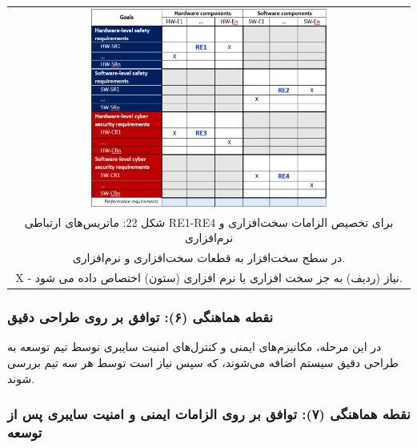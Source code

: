 \documentclass[a4paper,10pt]{article}
\begin{document}
                \begin{table}
            
                    \centering
                    \begin{tabular}{ c }
                        
                        \includegraphics[width=0.6\textwidth]{Image/fig22.jpg} \\
        
                        شکل 22: ماتریس‌های ارتباطی RE1-RE4 برای تخصیص الزامات سخت‌افزاری و نرم‌افزاری\\
                        
                        در سطح سخت‌افزار به قطعات سخت‌افزاری و نرم‌افزاری.\\

                        X - نیاز (ردیف) به جز سخت افزاری یا نرم افزاری (ستون) اختصاص داده می شود.
    
                    \end{tabular}
        
                \end{table}

            \subsubsection{نقطه هماهنگی (۶): توافق بر روی طراحی دقیق}

                در این مرحله، مکانیزم‌های ایمنی و کنترل‌های امنیت سایبری توسط تیم توسعه به طراحی دقیق سیستم اضافه می‌شوند، که سپس نیاز است توسط هر سه تیم بررسی شوند.

            \subsubsection{نقطه هماهنگی (۷): توافق بر روی الزامات ایمنی و امنیت سایبری پس از توسعه}
\end{document}
